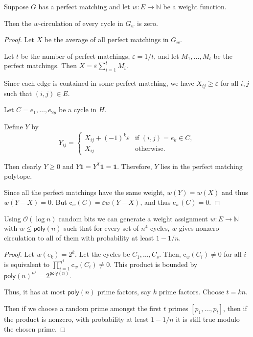 \documentclass{beamer}
\theoremstyle{remark}
\newcommand{\nn}{\mathbb{N}}
\newcommand{\cl}{\text{c}}
\newcommand{\OO}{\mathcal{O}}
\begin{document}
\begin{frame}[allowframebreaks]
  \begin{lemma}
    Suppose $G$ has a perfect matching and let
    $w : E \to \nn$ be a weight function.

    Then the $w$-circulation of every cycle in $G_w$ is zero.
  \end{lemma}

  \begin{proof}
    Let $X$ be the average of all perfect matchings in $G_w$.

    Let $t$ be the number of perfect matchings, $\varepsilon = 1/t$, and let
    $M_1, \ldots, M_t$ be the perfect matchings.
    Then $X = \varepsilon \sum_{i = 1}^t M_i$.

    Since each edge is contained in some perfect matching, we have
    $X_{ij} \ge \varepsilon$ for all $i, j$ such that
    $(i, j) \in E$.

    Let $C = {e_1, \ldots, e_{2p}}$ be a cycle in $H$.

    Define $Y$ by
    \[
      Y_{ij} =
      \begin{cases}
        X_{ij} + (-1)^{k} \varepsilon & \text{if } (i, j) = e_k \in C, \\
        X_{ij}                        & \text{otherwise}.
      \end{cases}
    \]

    Then clearly $Y \ge 0$ and $Y \mathbf{1} = Y^T \mathbf{1} = \mathbf{1}$.
    Therefore, $Y$ lies in the perfect matching polytope.

    Since all the perfect matchings have the same weight, $w(Y) = w(X)$
    and thus $w(Y - X) = 0$.
    But $\cl_w(C) = \varepsilon w(Y - X)$, and thus $\cl_w(C) = 0$.
  \end{proof}
\end{frame}
\begin{frame}
  \begin{lemma}
    Using $\OO(\log n)$ random bits we can
    generate a weight assignment
    $w : E \to \nn$ with $w \le \mathsf{poly}(n)$ such that for every set
    of $n^4$ cycles,
    $w$ gives nonzero circulation to all of them with probability at
    least $1 - 1/n$.
  \end{lemma}

  \begin{proof}
    Let $w(e_k) = 2^k$.
    Let the cycles be $C_1, \ldots, C_s$. Then, $\cl_w(C_i) \ne 0$ for
    all $i$ is equivalent to
    $\prod_{i = 1}^{n^4} \cl_w(C_i) \ne 0$. This product is bounded by
    $\mathsf{poly}(n)^{n^4} = 2^{\mathsf{poly}(n)}$.

    Thus, it has at most $\mathsf{poly}(n)$ prime factors, say $k$ prime
    factors. Choose $t = kn$.

    Then if we choose a random prime amongst the first $t$ primes
    $[p_1, \ldots, p_t]$, then if the product is nonzero,
    with probability at least $1 - 1/n$ it is still true modulo the chosen prime.
  \end{proof}
\end{frame}
\end{document}
